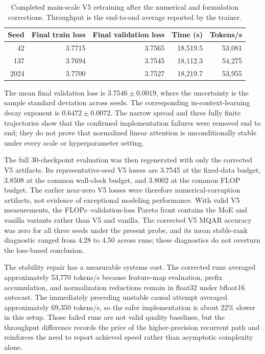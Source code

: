 \documentclass[11pt,a4paper]{article}
\theoremstyle{definition}
\theoremstyle{plain}
\begin{document}
\begin{table}[H]
\centering
\caption{Completed main-scale V5 retraining after the numerical and formulation corrections. Throughput is the end-to-end average reported by the trainer.}
\label{tab:v5-fixed-retraining}
\begin{tabular}{@{}rrrrr@{}}
\toprule
Seed & Final train loss & Final validation loss & Time (s) & Tokens/s \\
\midrule
42   & 3.7715 & 3.7565 & 18,519.5 & 53,081 \\
137  & 3.7694 & 3.7545 & 18,112.3 & 54,275 \\
2024 & 3.7700 & 3.7527 & 18,219.7 & 53,955 \\
\bottomrule
\end{tabular}
\end{table}

The mean final validation loss is $3.7546\pm0.0019$, where the uncertainty is the sample standard deviation across seeds. The corresponding in-context-learning decay exponent is $0.6472\pm0.0072$. The narrow spread and three fully finite trajectories show that the confirmed implementation failures were removed end to end; they do not prove that normalized linear attention is unconditionally stable under every scale or hyperparameter setting.

The full 30-checkpoint evaluation was then regenerated with only the corrected V5 artifacts. Its representative-seed V5 losses are 3.7545 at the fixed-data budget, 3.8508 at the common wall-clock budget, and 3.8002 at the common FLOP budget. The earlier near-zero V5 losses were therefore numerical-corruption artifacts, not evidence of exceptional modeling performance. With valid V5 measurements, the FLOPs--validation-loss Pareto front contains the MoE and vanilla variants rather than V5 and vanilla. The corrected V5 MQAR accuracy was zero for all three seeds under the present probe, and its mean stable-rank diagnostic ranged from 4.28 to 4.50 across runs; these diagnostics do not overturn the loss-based conclusion.

The stability repair has a measurable systems cost. The corrected runs averaged approximately 53,770 tokens/s because feature-map evaluation, prefix accumulation, and normalization reductions remain in float32 under bfloat16 autocast. The immediately preceding unstable causal attempt averaged approximately 69,350 tokens/s, so the safer implementation is about 22\% slower in this setup. Those failed runs are not valid quality baselines, but the throughput difference records the price of the higher-precision recurrent path and reinforces the need to report achieved speed rather than asymptotic complexity alone.
\end{document}

